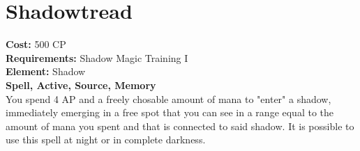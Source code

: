 \section{Shadowtread}
\textbf{Cost:} 500 CP\\
\textbf{Requirements:} Shadow Magic Training I\\
\textbf{Element:} Shadow\\
\textbf{Spell, Active, Source, Memory}\\
You spend 4 AP and a freely chosable amount of mana to "enter" a shadow, immediately emerging in a free spot that you can see in a range equal to the amount of mana you spent and that is connected to said shadow. It is possible to use this spell at night or in complete darkness.\\